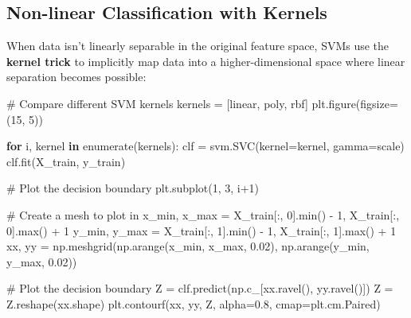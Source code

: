 \documentclass[
  letterpaper,
  DIV=11,
  numbers=noendperiod]{scrreprt}
\newenvironment{Shaded}{\begin{snugshade}}{\end{snugshade}}
\newcommand{\BuiltInTok}[1]{\textcolor[rgb]{0.00,0.23,0.31}{#1}}
\newcommand{\CommentTok}[1]{\textcolor[rgb]{0.37,0.37,0.37}{#1}}
\newcommand{\ControlFlowTok}[1]{\textcolor[rgb]{0.00,0.23,0.31}{\textbf{#1}}}
\newcommand{\DecValTok}[1]{\textcolor[rgb]{0.68,0.00,0.00}{#1}}
\newcommand{\FloatTok}[1]{\textcolor[rgb]{0.68,0.00,0.00}{#1}}
\newcommand{\KeywordTok}[1]{\textcolor[rgb]{0.00,0.23,0.31}{\textbf{#1}}}
\newcommand{\NormalTok}[1]{\textcolor[rgb]{0.00,0.23,0.31}{#1}}
\newcommand{\OperatorTok}[1]{\textcolor[rgb]{0.37,0.37,0.37}{#1}}
\newcommand{\StringTok}[1]{\textcolor[rgb]{0.13,0.47,0.30}{#1}}
\begin{document}
\subsection{Non-linear Classification with
Kernels}\label{non-linear-classification-with-kernels}

When data isn't linearly separable in the original feature space, SVMs
use the \textbf{kernel trick} to implicitly map data into a
higher-dimensional space where linear separation becomes possible:

\begin{Shaded}
\begin{Highlighting}[]
\CommentTok{\# Compare different SVM kernels}
\NormalTok{kernels }\OperatorTok{=}\NormalTok{ [}\StringTok{\textquotesingle{}linear\textquotesingle{}}\NormalTok{, }\StringTok{\textquotesingle{}poly\textquotesingle{}}\NormalTok{, }\StringTok{\textquotesingle{}rbf\textquotesingle{}}\NormalTok{]}
\NormalTok{plt.figure(figsize}\OperatorTok{=}\NormalTok{(}\DecValTok{15}\NormalTok{, }\DecValTok{5}\NormalTok{))}

\ControlFlowTok{for}\NormalTok{ i, kernel }\KeywordTok{in} \BuiltInTok{enumerate}\NormalTok{(kernels):}
\NormalTok{    clf }\OperatorTok{=}\NormalTok{ svm.SVC(kernel}\OperatorTok{=}\NormalTok{kernel, gamma}\OperatorTok{=}\StringTok{\textquotesingle{}scale\textquotesingle{}}\NormalTok{)}
\NormalTok{    clf.fit(X\_train, y\_train)}
    
    \CommentTok{\# Plot the decision boundary}
\NormalTok{    plt.subplot(}\DecValTok{1}\NormalTok{, }\DecValTok{3}\NormalTok{, i}\OperatorTok{+}\DecValTok{1}\NormalTok{)}
    
    \CommentTok{\# Create a mesh to plot in}
\NormalTok{    x\_min, x\_max }\OperatorTok{=}\NormalTok{ X\_train[:, }\DecValTok{0}\NormalTok{].}\BuiltInTok{min}\NormalTok{() }\OperatorTok{{-}} \DecValTok{1}\NormalTok{, X\_train[:, }\DecValTok{0}\NormalTok{].}\BuiltInTok{max}\NormalTok{() }\OperatorTok{+} \DecValTok{1}
\NormalTok{    y\_min, y\_max }\OperatorTok{=}\NormalTok{ X\_train[:, }\DecValTok{1}\NormalTok{].}\BuiltInTok{min}\NormalTok{() }\OperatorTok{{-}} \DecValTok{1}\NormalTok{, X\_train[:, }\DecValTok{1}\NormalTok{].}\BuiltInTok{max}\NormalTok{() }\OperatorTok{+} \DecValTok{1}
\NormalTok{    xx, yy }\OperatorTok{=}\NormalTok{ np.meshgrid(np.arange(x\_min, x\_max, }\FloatTok{0.02}\NormalTok{),}
\NormalTok{                         np.arange(y\_min, y\_max, }\FloatTok{0.02}\NormalTok{))}
    
    \CommentTok{\# Plot the decision boundary}
\NormalTok{    Z }\OperatorTok{=}\NormalTok{ clf.predict(np.c\_[xx.ravel(), yy.ravel()])}
\NormalTok{    Z }\OperatorTok{=}\NormalTok{ Z.reshape(xx.shape)}
\NormalTok{    plt.contourf(xx, yy, Z, alpha}\OperatorTok{=}\FloatTok{0.8}\NormalTok{, cmap}\OperatorTok{=}\NormalTok{plt.cm.Paired)}
    

\end{Highlighting}
\end{Shaded}
\end{document}
